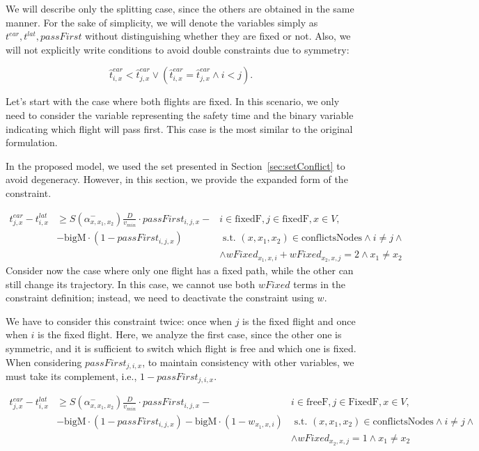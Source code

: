 \documentclass[../thesis.tex]{subfiles}
\begin{document}
We will describe only the splitting case, since the others are obtained in the same manner. 
For the sake of simplicity, we will denote the variables simply as $t^{ear}, t^{lat}, passFirst$ without distinguishing whether they are fixed or not. Also, we will not explicitly write conditions to avoid double constraints due to symmetry:

\[
\hat t^{ear}_{i,x} < \hat t^{ear}_{j,x} \lor (\hat t^{ear}_{i,x} = \hat t^{ear}_{j,x} \land i<j).
\]

Let's start with the case where both flights are fixed. In this scenario, we only need to consider the variable representing the safety time and the binary variable indicating which flight will pass first. This case is the most similar to the original formulation.

In the proposed model, we used the set presented in Section~\ref{sec:setConflict} to avoid degeneracy. However, in this section, we provide the expanded form of the constraint.

{\tiny
\begin{align}\label{eq:constrain:mercedesBothFixed}
\nonumber
t^{ear}_{j,x} - t^{lat}_{i,x} &
\geq S(\alpha^-_{x,x_1,x_2})\frac{D}{v_{min}} \cdot passFirst_{i,j,x} - 
& i \in \text{fixedF}, j \in \text{fixedF}, x \in V, \\
\nonumber
& -\text{bigM} \cdot (1-passFirst_{i,j,x})
& \text{ s.t. } (x,x_1,x_2) \in \text{conflictsNodes} \land i\neq j \land \\
&& \land  wFixed_{x_1,x,i} + wFixed_{x_2,x,j} = 2 \land x_1\neq x_2
\end{align}
}
Consider now the case where only one flight has a fixed path, while the other can still change its trajectory. In this case, we cannot use both $wFixed$ terms in the constraint definition; instead, we need to deactivate the constraint using $w$.

We have to consider this constraint twice: once when $j$ is the fixed flight and once when $i$ is the fixed flight. Here, we analyze the first case, since the other one is symmetric, and it is sufficient to switch which flight is free and which one is fixed.
When considering \( passFirst_{j,i,x} \), to maintain consistency with other variables, we must take its complement, i.e., \( 1 - passFirst_{j,i,x} \).


{\tiny
\begin{align}\label{eq:constrain:mercedesOneFixed}
\nonumber
t^{ear}_{j,x} - t^{lat}_{i,x} &
\geq S(\alpha^-_{x,x_1,x_2})\frac{D}{v_{min}} \cdot passFirst_{i,j,x} - 
& i \in \text{freeF}, j \in \text{FixedF}, x \in V, \\
\nonumber
& -\text{bigM} \cdot (1-passFirst_{i,j,x}) - \text{bigM} \cdot (1-w_{x_1,x,i})
& \text{ s.t. } (x,x_1,x_2) \in \text{conflictsNodes} \land i\neq j \land \\
&& \land wFixed_{x_2,x,j} = 1 \land x_1\neq x_2
\end{align}
}
\end{document}
